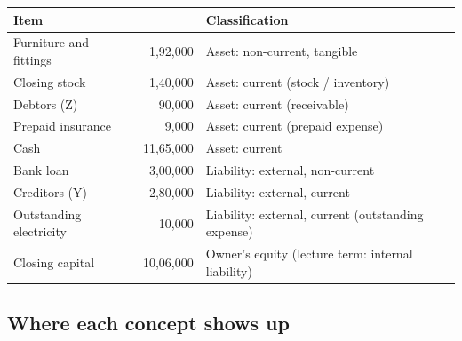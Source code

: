 \documentclass[11pt,a4paper]{article}
\newcommand{\Rs}{\ifmmode\text{\rsfont ₹}\else{\rsfont ₹}\fi}
\begin{document}
\begin{center}
\small
\begin{tabularx}{\textwidth}{@{}l r Y@{}}
\toprule
{}\textbf{Item} & \textbf{\Rs} & \textbf{Classification}\\
\midrule
Furniture and fittings & 1,92,000 & Asset: non-current, tangible\\
Closing stock & 1,40,000 & Asset: current (stock / inventory)\\
Debtors (Z) & 90,000 & Asset: current (receivable)\\
Prepaid insurance & 9,000 & Asset: current (prepaid expense)\\
Cash & 11,65,000 & Asset: current\\
Bank loan & 3,00,000 & Liability: external, non-current\\
Creditors (Y) & 2,80,000 & Liability: external, current\\
Outstanding electricity & 10,000 & Liability: external, current (outstanding expense)\\
Closing capital & 10,06,000 & Owner's equity (lecture term: internal liability)\\
\bottomrule
\end{tabularx}
\end{center}

\subsection{Where each concept shows up}
\end{document}
